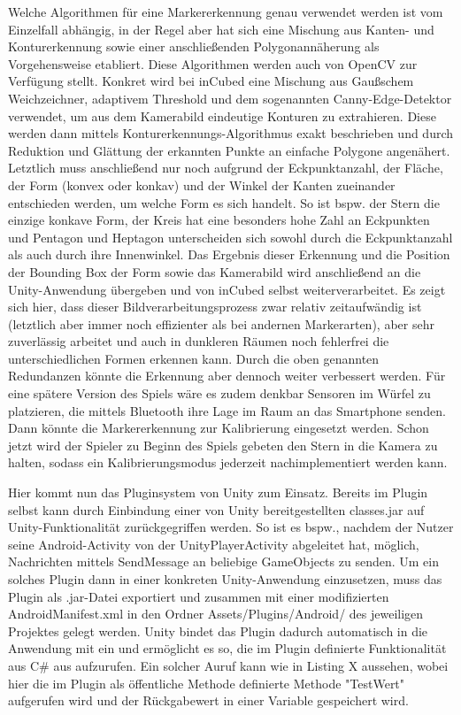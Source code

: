 Welche Algorithmen für eine Markererkennung genau verwendet werden ist vom Einzelfall abhängig, in der Regel aber hat sich eine Mischung aus Kanten- und Konturerkennung sowie einer anschließenden Polygonannäherung als Vorgehensweise etabliert. Diese Algorithmen werden auch von OpenCV zur Verfügung stellt. Konkret wird bei inCubed eine Mischung aus Gaußschem Weichzeichner, adaptivem Threshold und dem sogenannten Canny-Edge-Detektor verwendet, um aus dem Kamerabild eindeutige Konturen zu extrahieren. Diese werden dann mittels Konturerkennungs-Algorithmus exakt beschrieben und durch Reduktion und Glättung der erkannten Punkte an einfache Polygone angenähert. Letztlich muss anschließend nur noch aufgrund der Eckpunktanzahl, der Fläche, der Form (konvex oder konkav) und der Winkel der Kanten zueinander entschieden werden, um welche Form es sich handelt. So ist bspw. der Stern die einzige konkave Form, der Kreis hat eine besonders hohe Zahl an Eckpunkten und Pentagon und Heptagon unterscheiden sich sowohl durch die Eckpunktanzahl als auch durch ihre Innenwinkel. Das Ergebnis dieser Erkennung und die Position der Bounding Box der Form sowie das Kamerabild wird anschließend an die Unity-Anwendung übergeben und von inCubed selbst weiterverarbeitet. Es zeigt sich hier, dass dieser Bildverarbeitungsprozess zwar relativ zeitaufwändig ist (letztlich aber immer noch effizienter als bei andernen Markerarten), aber sehr zuverlässig arbeitet und auch in dunkleren Räumen noch fehlerfrei die unterschiedlichen Formen erkennen kann. Durch die oben genannten Redundanzen könnte die Erkennung aber dennoch weiter verbessert werden. Für eine spätere Version des Spiels wäre es zudem denkbar Sensoren im Würfel zu platzieren, die mittels Bluetooth ihre Lage im Raum an das Smartphone senden. Dann könnte die Markererkennung zur Kalibrierung eingesetzt werden. Schon jetzt wird der Spieler zu Beginn des Spiels gebeten den Stern in die Kamera zu halten, sodass ein Kalibrierungsmodus jederzeit nachimplementiert werden kann.

Hier kommt nun das Pluginsystem von Unity zum Einsatz. Bereits im Plugin selbst kann durch Einbindung einer von Unity bereitgestellten classes.jar auf Unity-Funktionalität zurückgegriffen werden. So ist es bspw., nachdem der Nutzer seine Android-Activity von der UnityPlayerActivity abgeleitet hat, möglich, Nachrichten mittels SendMessage an beliebige GameObjects zu senden. Um ein solches Plugin dann in einer konkreten Unity-Anwendung einzusetzen, muss das Plugin als .jar-Datei exportiert und zusammen mit einer modifizierten AndroidManifest.xml in den Ordner Assets/Plugins/Android/ des jeweiligen Projektes gelegt werden. Unity bindet das Plugin dadurch automatisch in die Anwendung mit ein und ermöglicht es so, die im Plugin definierte Funktionalität aus C\# aus aufzurufen. Ein solcher Auruf kann wie in Listing X aussehen, wobei hier die im Plugin als öffentliche Methode definierte Methode "TestWert" aufgerufen wird und der Rückgabewert in einer Variable gespeichert wird.


